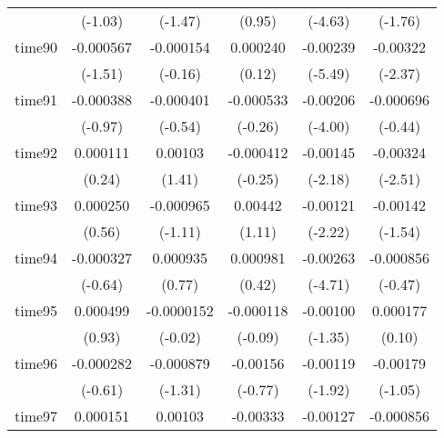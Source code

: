 \begin{table}[htbp]
\begin{tabular}{l*{5}{c}}
            &     (-1.03)         &     (-1.47)         &      (0.95)         &     (-4.63)         &     (-1.76)         \\
time90      &   -0.000567         &   -0.000154         &    0.000240         &    -0.00239\sym{***}&    -0.00322\sym{*}  \\
            &     (-1.51)         &     (-0.16)         &      (0.12)         &     (-5.49)         &     (-2.37)         \\
time91      &   -0.000388         &   -0.000401         &   -0.000533         &    -0.00206\sym{***}&   -0.000696         \\
            &     (-0.97)         &     (-0.54)         &     (-0.26)         &     (-4.00)         &     (-0.44)         \\
time92      &    0.000111         &     0.00103         &   -0.000412         &    -0.00145\sym{*}  &    -0.00324\sym{*}  \\
            &      (0.24)         &      (1.41)         &     (-0.25)         &     (-2.18)         &     (-2.51)         \\
time93      &    0.000250         &   -0.000965         &     0.00442         &    -0.00121\sym{*}  &    -0.00142         \\
            &      (0.56)         &     (-1.11)         &      (1.11)         &     (-2.22)         &     (-1.54)         \\
time94      &   -0.000327         &    0.000935         &    0.000981         &    -0.00263\sym{***}&   -0.000856         \\
            &     (-0.64)         &      (0.77)         &      (0.42)         &     (-4.71)         &     (-0.47)         \\
time95      &    0.000499         &  -0.0000152         &   -0.000118         &    -0.00100         &    0.000177         \\
            &      (0.93)         &     (-0.02)         &     (-0.09)         &     (-1.35)         &      (0.10)         \\
time96      &   -0.000282         &   -0.000879         &    -0.00156         &    -0.00119         &    -0.00179         \\
            &     (-0.61)         &     (-1.31)         &     (-0.77)         &     (-1.92)         &     (-1.05)         \\
time97      &    0.000151         &     0.00103         &    -0.00333         &    -0.00127\sym{*}  &   -0.000856         \\

\end{tabular}
\end{table}
